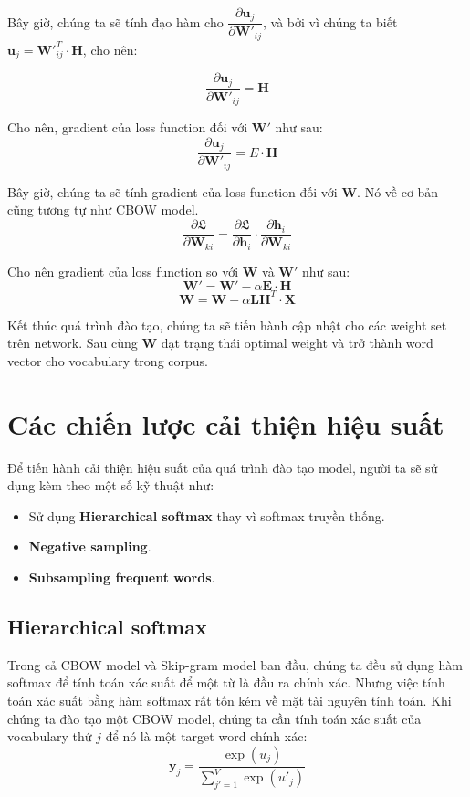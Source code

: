 \documentclass[12pt]{article}
\newcommand{\itemsizePaddingLeft}{\setlength{\itemindent}{0.6cm}}
\begin{document}
\indent Bây giờ, chúng ta sẽ tính đạo hàm cho $\dfrac{\partial \boldsymbol{u}_j}{\partial \boldsymbol{W'}_{ij}}$, và bởi vì chúng ta biết $\boldsymbol{u}_j = \boldsymbol{W'}_{ij}^T \cdot \boldsymbol{H}$, cho nên:

$$\dfrac{\partial \boldsymbol{u}_j}{\partial \boldsymbol{W'}_{ij}} = \boldsymbol{H}$$

\indent Cho nên, gradient của loss function đối với $\boldsymbol{W'}$ như sau:
$$\dfrac{\partial \boldsymbol{u}_j}{\partial \boldsymbol{W'}_{ij}} = E \cdot \boldsymbol{H}$$

\indent Bây giờ, chúng ta sẽ tính gradient của loss function đối với $\boldsymbol{W}$. Nó về cơ bản cũng tương tự như CBOW model.
$$\dfrac{\partial \mathfrak{L}}{\partial \boldsymbol{W}_{ki}} = \dfrac{\partial \mathfrak{L}}{\partial \boldsymbol{h}_i} \cdot \dfrac{\partial \boldsymbol{h}_i}{\partial \boldsymbol{W}_{ki}}$$

\indent Cho nên gradient của loss function so với $\boldsymbol{W}$ và $\boldsymbol{W'}$ như sau:
$$\boldsymbol{W'} = \boldsymbol{W'} - \alpha \boldsymbol{E} \cdot \boldsymbol{H}$$
$$\boldsymbol{W} = \boldsymbol{W} - \alpha \boldsymbol{LH}^T \cdot \boldsymbol{X}$$

\indent Kết thúc quá trình đào tạo, chúng ta sẽ tiến hành cập nhật cho các weight set trên network. Sau cùng $\boldsymbol{W}$ đạt trạng thái optimal weight và trở thành word vector cho vocabulary trong corpus.

\section{Các chiến lược cải thiện hiệu suất}
Để tiến hành cải thiện hiệu suất của quá trình đào tạo model, người ta sẽ sử dụng kèm theo một số kỹ thuật như:
\begin{itemize}
  \itemsizePaddingLeft
  \item Sử dụng \textbf{Hierarchical softmax} thay vì softmax truyền thống.
  \item \textbf{Negative sampling}.
  \item \textbf{Subsampling frequent words}.
\end{itemize}

\subsection{Hierarchical softmax}
Trong cả CBOW model và Skip-gram model ban đầu, chúng ta đều sử dụng hàm softmax để tính toán xác suất để một từ là đầu ra chính xác. Nhưng việc tính toán xác suất bằng hàm softmax rất tốn kém về mặt tài nguyên tính toán. Khi chúng ta đào tạo một CBOW model, chúng ta cần tính toán xác suất của vocabulary thứ $j$ để nó là một target word chính xác:
$$\boldsymbol{y}_j = \dfrac{\exp{(u_j)}}{\sum^V_{j'=1} \exp{(u'_j)}}$$
\end{document}
